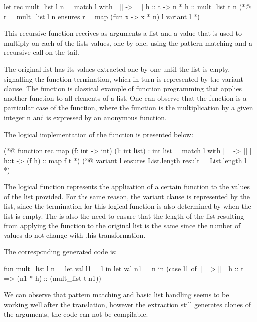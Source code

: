 \begin{gospell}
let rec mult_list l n =
    match l with
    | [] -> []
    | h :: t -> n * h :: mult_list t n
(*@ r = mult_list l n
        ensures r = map (fun x -> x * n) l
        variant l *)
\end{gospell}

This recursive function  receives as arguments a list and a value that is used to multiply on each of the
lists values, one by one, using the pattern matching and a recursive call on the tail.

The original list has its values extracted one by one until the list is empty, signalling the function termination, which in turn is 
represented by the variant clause. The function  is classical example of function programming that applies another 
function to all elements of a list. One can observe that the  function is a particular case of the  
function, where the function is the multiplication by a given integer n and is expressed by an anonymous function. 

The logical implementation of the  function is presented below:

\begin{gospell}
(*@ function rec map (f: int -> int) (l: int list) : int list = 
        match l with
        | [] -> []
        | h::t -> (f h) :: map f t *)
(*@ variant l
        ensures List.length result = List.length l *)
\end{gospell}

The logical function  represents the application of a certain function to the values of the list provided. For the same
reason, the variant clause is represented by the list, since the termination for this logical function is also determined by when the
list is empty. The is also the need to ensure that the length of the list resulting from applying the function to the original list
is the same since the number of values do not change with this transformation.

The corresponding generated code is:

\begin{cakeml}
fun mult_list l n = let val l1 = l in
    let val n1 = n in
    (case l1 of
        [] => []
    | h :: t => (n1 * h) :: (mult_list t n1))
\end{cakeml}

We can observe that pattern matching and basic list handling seems to be working well after the translation, however the extraction 
still generates clones of the arguments, the code can not be compilable. 

